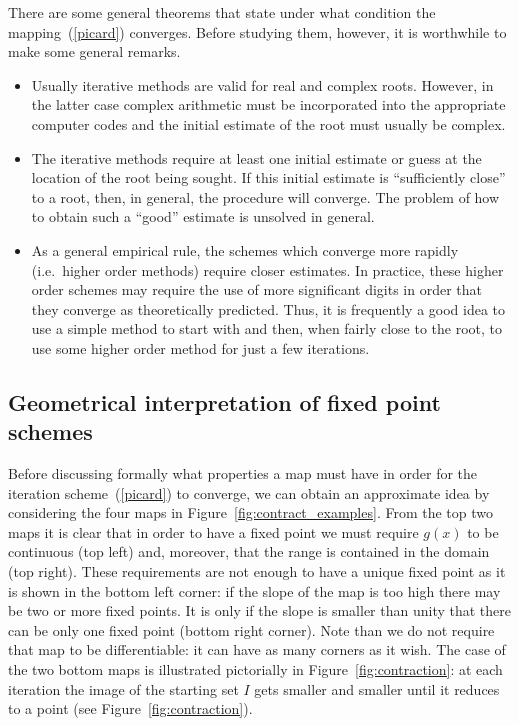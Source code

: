 There are some general theorems that state under what condition the
mapping~(\ref{picard}) converges.   Before studying them, however, it
is worthwhile to make some general remarks.

\begin{itemize}
%
\item Usually iterative methods are valid for real and complex roots.
  However, in the latter case complex arithmetic must be incorporated
  into the appropriate computer codes and the initial estimate of the
  root must usually be complex.
%
\item The iterative methods require at least one initial estimate or
  guess at the location of the root being sought. If this initial
  estimate is ``sufficiently close'' to a root, then, in general, the
  procedure will converge.  The problem of how to obtain such a
  ``good'' estimate is unsolved in general.
%
\item As a general empirical rule, the schemes which converge more
  rapidly (i.e.\ higher order methods) require closer estimates.  In
  practice, these higher order schemes may require the use of more
  significant digits in order that they converge as theoretically
  predicted.  Thus, it is frequently a good idea to use a simple
  method to start with and then, when fairly close to the root, to use
  some higher order method for just a few iterations.
%
\end{itemize}

\subsection{Geometrical interpretation of fixed point schemes}

Before discussing formally what properties a map must have in order
for the iteration scheme~(\ref{picard}) to converge, we can obtain an
approximate idea by considering the four maps in
Figure~\ref{fig:contract_examples}.    From the top two maps it is
clear that in order to have a fixed point we must require $g(x)$ to be
continuous (top left) and, moreover, that the range is contained in
the domain (top right).    These requirements are not enough to have a
unique fixed point as it is shown in the bottom left corner: if the
slope of the map is too high there may be two or more fixed points.
It is only if the slope is smaller than unity that there can be only
one fixed point (bottom right corner).   Note than we do not require
that map to be differentiable: it can have as many corners as it wish.
The case of the two bottom maps is illustrated pictorially in
Figure~\ref{fig:contraction}: at each iteration the image of
the starting set $I$ gets smaller and smaller until it reduces to a
point (see Figure~\ref{fig:contraction}).

